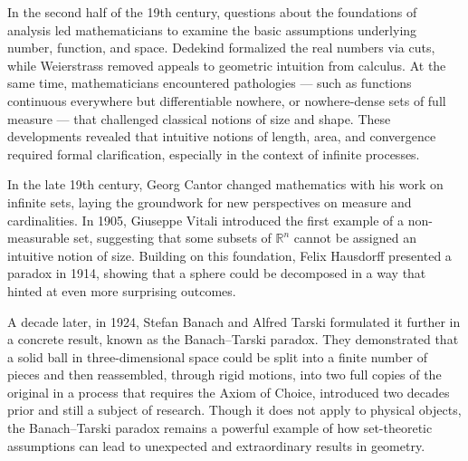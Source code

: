 \begin{historical}
In the second half of the 19th century, questions about the foundations of analysis led mathematicians to examine the basic assumptions underlying number, function, and space. Dedekind formalized the real numbers via cuts, while Weierstrass removed appeals to geometric intuition from calculus. At the same time, mathematicians encountered pathologies — such as functions continuous everywhere but differentiable nowhere, or nowhere-dense sets of full measure — that challenged classical notions of size and shape. These developments revealed that intuitive notions of length, area, and convergence required formal clarification, especially in the context of infinite processes.

In the late 19th century, Georg Cantor changed mathematics with his work on infinite sets, laying the groundwork for new perspectives on measure and cardinalities. In 1905, Giuseppe Vitali introduced the first example of a non-measurable set, suggesting that some subsets of \( \mathbb{R}^n \) cannot be assigned an intuitive notion of size. Building on this foundation, Felix Hausdorff presented a paradox in 1914, showing that a sphere could be decomposed in a way that hinted at even more surprising outcomes.

A decade later, in 1924, Stefan Banach and Alfred Tarski formulated it further in a concrete result, known as the Banach–Tarski paradox. They demonstrated that a solid ball in three-dimensional space could be split into a finite number of pieces and then reassembled, through rigid motions, into two full copies of the original in a process that requires the Axiom of Choice, introduced two decades prior and still a subject of research. Though it does not apply to physical objects, the Banach–Tarski paradox remains a powerful example of how set-theoretic assumptions can lead to unexpected and extraordinary results in geometry.
\end{historical}
